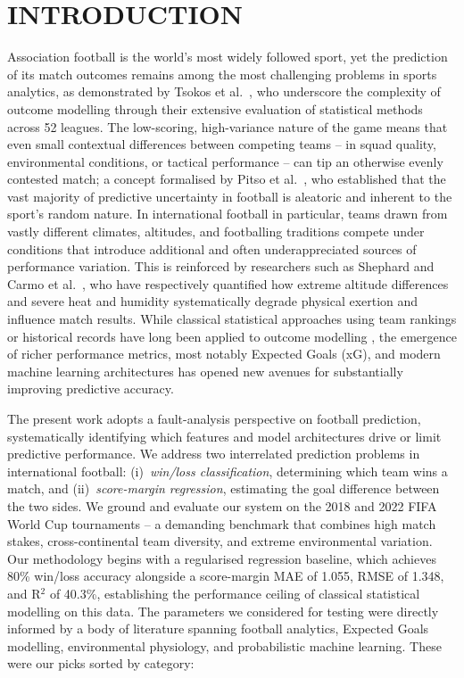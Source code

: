 \documentclass[a4paper,twoside]{article}
\begin{document}
\section{\uppercase{Introduction}}
\label{sec:introduction}

\noindent
Association football is the world's most widely followed sport, yet the prediction of its match outcomes remains among the most challenging problems in sports analytics, as demonstrated by Tsokos et al.\ \cite{tsokos_modeling_2019}, who underscore the complexity of outcome modelling through their extensive evaluation of statistical methods across 52 leagues.
The low-scoring, high-variance nature of the game means that even small contextual differences between competing teams -- in squad quality, environmental conditions, or tactical performance -- can tip an otherwise evenly contested match; a concept formalised by Pitso et al.\ \cite{pitso_bayesian_2026}, who established that the vast majority of predictive uncertainty in football is aleatoric and inherent to the sport's random nature.
In international football in particular, teams drawn from vastly different climates, altitudes, and footballing traditions compete under conditions that introduce additional and often underappreciated sources of performance variation. This is reinforced by researchers such as Shephard \cite{shephard_altitude_2008} and Carmo et al.\ \cite{carmo_physical_2026}, who have respectively quantified how extreme altitude differences and severe heat and humidity systematically degrade physical exertion and influence match results.
While classical statistical approaches using team rankings or historical records have long been applied to outcome modelling \cite{tsokos_modeling_2019}, the emergence of richer performance metrics, most notably Expected Goals (xG), and modern machine learning architectures has opened new avenues for substantially improving predictive accuracy.

The present work adopts a fault-analysis perspective on football prediction, systematically identifying which features and model architectures drive or limit predictive performance.
We address two interrelated prediction problems in international football: (i)~\textit{win/loss classification}, determining which team wins a match, and (ii)~\textit{score-margin regression}, estimating the goal difference between the two sides.
We ground and evaluate our system on the 2018 and 2022 FIFA World Cup tournaments -- a demanding benchmark that combines high match stakes, cross-continental team diversity, and extreme environmental variation.
Our methodology begins with a regularised regression baseline, which achieves 80\% win/loss accuracy alongside a score-margin MAE of 1.055, RMSE of 1.348, and R$^{2}$ of 40.3\%, establishing the performance ceiling of classical statistical modelling on this data.
The parameters we considered for testing were directly informed by a body of literature spanning football analytics, Expected Goals modelling, environmental physiology, and probabilistic machine learning. These were our picks sorted by category:
\end{document}
